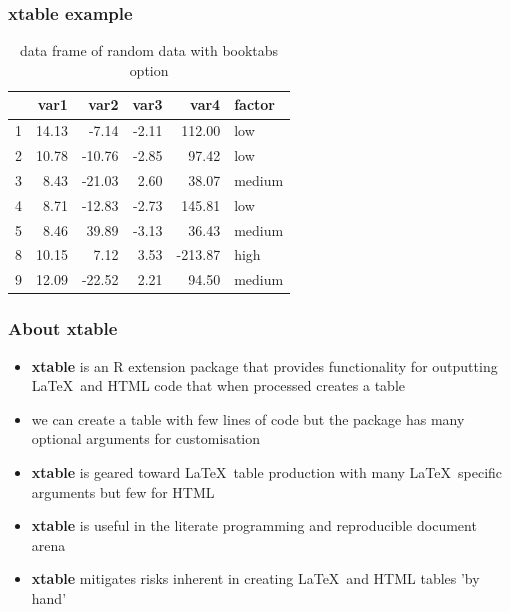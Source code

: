 \documentclass{beamer}
\begin{document}
\begin{frame}
  \frametitle{{\bfseries xtable} example}
  
  		\begin{table}[ht]
  		\centering
  		\begin{tabular}{|lr|r|r|r|l|}
  		  \toprule
  		 & var1 & var2 & var3 & var4 & factor \\ 
  		  \midrule
  		  1 & 14.13 & -7.14 & -2.11 & 112.00 & low \\ 
  		  2 & 10.78 & -10.76 & -2.85 & 97.42 & low \\ 
  		  3 & 8.43 & -21.03 & 2.60 & 38.07 & medium \\ 
  		  4 & 8.71 & -12.83 & -2.73 & 145.81 & low \\ 
  		  5 & 8.46 & 39.89 & -3.13 & 36.43 & medium \\  
  		  8 & 10.15 & 7.12 & 3.53 & -213.87 & high \\ 
  		  9 & 12.09 & -22.52 & 2.21 & 94.50 & medium \\ 
  		   \bottomrule
  		\end{tabular}
  		\caption{data frame of random data with booktabs option} 
  		\end{table}
  
\end{frame}

\begin{frame}
  \frametitle{About {\bfseries xtable}}
  \begin{itemize}
    \item {\bfseries xtable} is an R extension package that provides functionality for outputting \LaTeX \ and HTML code that when processed creates a table\\
    \item we can create a table with few lines of code but the package has many optional arguments for customisation\\
    \item {\bfseries xtable} is geared toward \LaTeX \ table production with many \LaTeX \ specific arguments but few for HTML\\
    \item {\bfseries xtable} is useful in the literate programming and reproducible document arena\\
    \item {\bfseries xtable} mitigates risks inherent in creating \LaTeX \ and HTML tables 'by hand'
  \end{itemize}
\end{frame}
\end{document}
